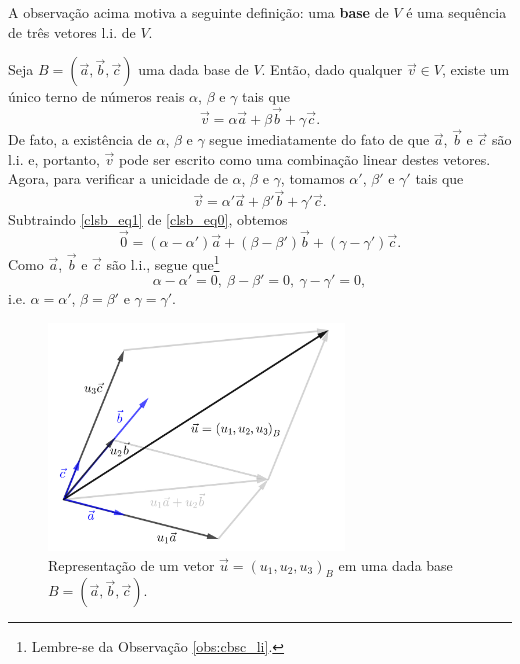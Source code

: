 A observação acima motiva a seguinte definição: uma {\bf base} de $V$ é uma sequência de três vetores l.i. de $V$.

Seja $B = (\vec{a}, \vec{b}, \vec{c})$ uma dada base de $V$. Então, dado qualquer $\vec{v}\in V$, existe um único terno de números reais $\alpha$, $\beta$ e $\gamma$ tais que
\begin{equation}
  \vec{v} = \alpha\vec{a} + \beta\vec{b} + \gamma\vec{c}.\label{clsb_eq0}
\end{equation}
De fato, a existência de $\alpha$, $\beta$ e $\gamma$ segue imediatamente do fato de que $\vec{a}$, $\vec{b}$ e $\vec{c}$ são l.i. e, portanto, $\vec{v}$ pode ser escrito como uma combinação linear destes vetores. Agora, para verificar a unicidade de $\alpha$, $\beta$ e $\gamma$, tomamos $\alpha'$, $\beta'$ e $\gamma'$ tais que
\begin{equation}
  \vec{v} = \alpha'\vec{a} + \beta'\vec{b} + \gamma'\vec{c}.\label{clsb_eq1}
\end{equation}
Subtraindo \eqref{clsb_eq1} de \eqref{clsb_eq0}, obtemos
\begin{equation}
  \vec{0} = (\alpha-\alpha')\vec{a}+(\beta-\beta')\vec{b}+(\gamma-\gamma')\vec{c}.
\end{equation}
Como $\vec{a}$, $\vec{b}$ e $\vec{c}$ são l.i., segue que\footnote{Lembre-se da Observação \ref{obs:cbsc_li}.}
\begin{equation}
  \alpha-\alpha'=0,~\beta-\beta'=0,~\gamma-\gamma'=0,
\end{equation}
i.e. $\alpha=\alpha'$, $\beta=\beta'$ e $\gamma=\gamma'$.

\begin{figure}[H]
  \centering
  \includegraphics[width=0.7\textwidth]{./cap_base/dados/fig_coord/fig_coord}
  \caption{Representação de um vetor $\vec{u} = (u_1, u_2, u_3)_B$ em uma dada base $B=(\vec{a},\vec{b},\vec{c})$.}
  \label{fig:coord}
\end{figure}

